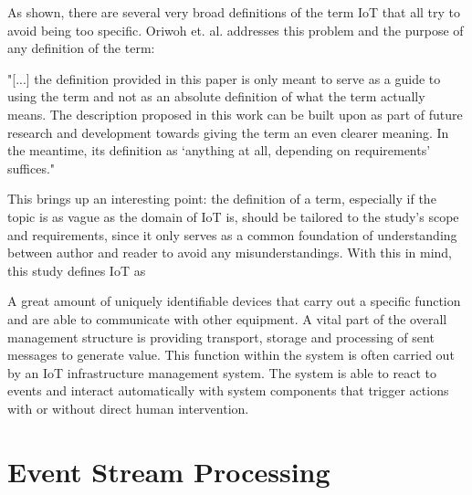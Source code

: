 \begin{enumerate}
    As shown, there are several very broad definitions of the term \ac{IoT} that all try to avoid being too specific. Oriwoh et. al. addresses this problem and the purpose of any definition of the term:
    
    \begin{displayquote}
        "[...] the definition
        provided in this paper is only meant to serve as a guide to
        using the term and not as an absolute definition of what the
        term actually means. The description proposed in this work
        can be built upon as part of future research and development
        towards giving the term an even clearer meaning. In the
        meantime, its definition as ‘anything at all, depending on
        requirements’ suffices."\autocite{Oriwoh2015ThingsDefinition}
    \end{displayquote}
    
    
    This brings up an interesting point: the definition of a term, especially if the topic is as vague as the domain of \ac{IoT} is, should be tailored to the study's scope and requirements, since it only serves as a common foundation of understanding between author and reader to avoid any misunderstandings. With this in mind, this study defines \ac{IoT} as 
    
    \begin{displayquote}
        A great amount of uniquely identifiable devices that carry out a specific function and are able to communicate with other equipment. A vital part of the overall management structure is providing transport, storage and processing of sent messages to generate value. This function within the system is often carried out by an \ac{IoT} infrastructure management system. The system is able to react to events and interact automatically with system components that trigger actions with or without direct human intervention.
    \end{displayquote}
    
\end{enumerate}


\section{Event Stream Processing}

